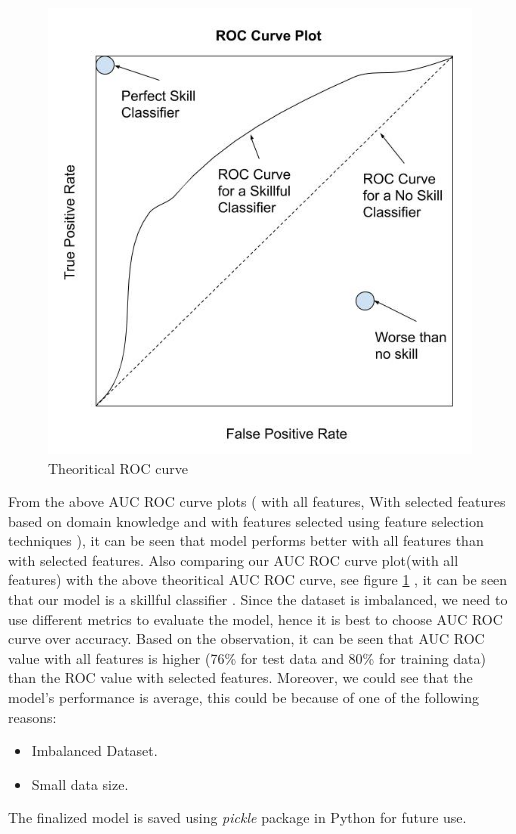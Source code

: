 \documentclass[format=sigconf]{acmart}
\begin{document}
\begin{figure}[h]
    \centering
    \includegraphics[scale=0.40]{theoritical-ROC-Curve.jpg}
    \caption{Theoritical ROC curve}
    \label{fig:theoroc}
\end{figure}
From the above AUC ROC curve plots ( with all features, With selected features based on domain knowledge and with features 
selected using feature selection techniques ), it can be seen that model performs better with all features than with selected 
features. Also comparing our AUC ROC curve plot(with all features) with the above theoritical AUC ROC curve, see figure \ref{fig:theoroc} 
\cite{theoroc}, it can be seen that our model is a skillful classifier . Since the dataset is imbalanced, we need to use different 
metrics to evaluate the model, hence it is best to choose AUC ROC curve over accuracy. Based on the observation, it can be seen 
that AUC ROC value with all features is higher (76\% for test data and 80\% for training data) than the ROC value with selected 
features. Moreover, we could see that the model's performance is average, this could be because of one of the following reasons:
\begin{itemize}
    \item Imbalanced Dataset.
    \item Small data size.
\end{itemize}
The finalized model is saved using \textit{pickle} package in Python for future use.
\end{document}

